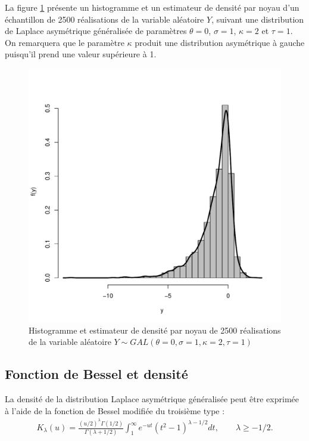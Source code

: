 La figure \ref{fig:simulGAL} présente un histogramme et un estimateur
de densité par noyau d'un échantillon de 2500 réalisations de la
variable aléatoire $Y$, suivant une distribution de Laplace
asymétrique généralisée de paramètres $\theta=0$, $\sigma=1$,
$\kappa=2$ et $\tau=1$. On remarquera que le paramètre $\kappa$
produit une distribution asymétrique à gauche puisqu'il prend une
valeur supérieure à 1.

\begin{figure}[!ht]
  \centering
  \includegraphics[scale=0.8]{"./graphiques/CH3-SIMULGAL0121"}
  \caption{Histogramme et estimateur de densité par noyau de 2500
    réalisations de la variable aléatoire $Y\sim
    GAL(\theta=0,\sigma=1,\kappa=2,\tau=1)$}
  \label{fig:simulGAL}
\end{figure}

\subsection{Fonction de Bessel et densité}
\label{sec:besseldensiteGAL}

La densité de la distribution Laplace asymétrique généralisée peut
être exprimée à l'aide de la fonction de Bessel modifiée du troisième
type \citep{abramowitz1965handbook}:
\begin{align}
  \label{eq:BesselK}
  K_{\lambda}(u) =
  \frac{(u/2)^{\lambda}\Gamma(1/2)}{\Gamma(\lambda+1/2)}
  \int_1^{\infty} e^{-ut} (t^2-1)^{\lambda-1/2}dt,\qquad \lambda \geq
  -1/2.
\end{align}

